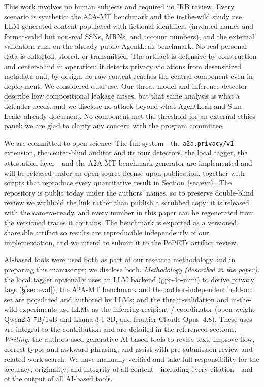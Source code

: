 \documentclass[sigconf,anonymous,review]{acmart}
\theoremstyle{acmplain}
\newcommand{\ext}{\texttt{a2a.privacy/v1}}
\begin{document}
\begin{ethics}
This work involves no human subjects and required no IRB review. Every scenario is
synthetic: the A2A-MT benchmark and the in-the-wild study use LLM-generated content
populated with fictional identifiers (invented names and format-valid but
non-real SSNs, MRNs, and account numbers), and the external validation runs on the
already-public AgentLeak benchmark. No real personal data is collected, stored, or
transmitted. The artifact is defensive by construction and center-blind in
operation: it detects privacy violations from desensitized metadata and, by design,
no raw content reaches the central component even in deployment. We considered
dual-use. Our threat model and inference detector describe how compositional
leakage arises, but that same analysis is what a defender needs, and we disclose no
attack beyond what AgentLeak and Sum-Leaks already document. No component met the
threshold for an external ethics panel; we are glad to clarify any concern with the
program committee.
\end{ethics}

\begin{openscience}
We are committed to open science. The full system---the \ext{} extension, the
center-blind auditor and its four detectors, the local tagger, the attestation
layer---and the A2A-MT benchmark generator are implemented and will be released
under an open-source license upon publication, together with scripts that reproduce
every quantitative result in Section~\ref{sec:eval}. The repository is public today under the authors' names, so to preserve double-blind review we withhold the link rather than publish a scrubbed copy; it is released with the camera-ready, and every number in this paper can be regenerated from the versioned traces it contains. The benchmark is exported as a versioned, shareable artifact so results
are reproducible independently of our implementation, and we intend to submit it to
the PoPETs artifact review.
\end{openscience}

\begin{ai}
AI-based tools were used both as part of our research methodology and in preparing
this manuscript; we disclose both. \emph{Methodology (described in the paper):} the
local tagger optionally uses an LLM backend (gpt-4o-mini) to derive privacy tags
(\S\ref{sec:eval}); the A2A-MT benchmark and the author-independent held-out set are
populated and authored by LLMs; and the threat-validation and in-the-wild experiments
use LLMs as the inferring recipient / coordinator (open-weight Qwen2.5-7B/14B and
Llama-3.1-8B, and frontier Claude Opus~4.8). These uses are integral to the
contribution and are detailed in the referenced sections. \emph{Writing:} the
authors used generative AI-based tools to revise text, improve flow, correct typos
and awkward phrasing, and assist with pre-submission review and related-work search.
We have manually verified and take full responsibility for the accuracy,
originality, and integrity of all content---including every citation---and of the
output of all AI-based tools.
\end{ai}

\appendix






\end{document}
